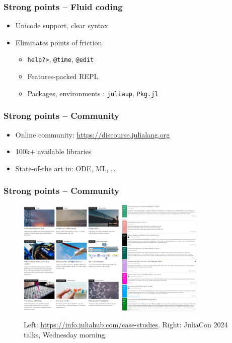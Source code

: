 \documentclass{beamer}
\begin{document}
\begin{frame}
    \frametitle{Strong points -- Fluid coding}
    \begin{itemize}
        \item Unicode support, clear syntax
        \item Eliminates points of friction
        \begin{itemize}
            \item {\tt help?>}, {\tt @time}, {\tt @edit}
            \item Features-packed REPL
            \item Packages, environments : \texttt{juliaup}, \texttt{Pkg.jl}
        \end{itemize}
    \end{itemize}
\end{frame}

\begin{frame}
    \frametitle{Strong points -- Community}
    \begin{itemize}
        \item Online community: \url{https://discourse.julialang.org}
        \item 100k+ available libraries
        \item State-of-the art in: ODE, ML, \dots
    \end{itemize}
\end{frame}

\begin{frame}
    \frametitle{Strong points -- Community}
    \begin{figure}[htbp]
        \centering
        \includegraphics[width=0.45\textwidth]{julia_case_studies.png}
        \includegraphics[width=0.35\textwidth]{juliacon_talks.png}
        \caption{Left: \url{https://info.juliahub.com/case-studies}. Right: JuliaCon 2024 talks, Wednesday morning.}
        \label{fig:julia_use}
    \end{figure}
\end{frame}
\end{document}
